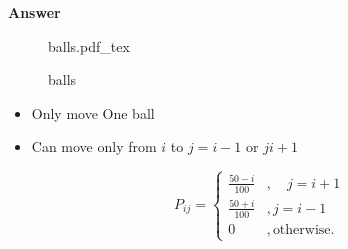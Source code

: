 \documentclass{article}
\newcommand{\incfig}[2][1]{%
\def\svgwidth{#1\columnwidth}
{#2.pdf_tex} } \pdfsuppresswarningpagegroup=1
\theoremstyle{remark}
\begin{document}
   \textbf{Answer}

\begin{figure}[ht]
    \centering
    \incfig{balls}
    \caption{balls}
    \label{fig:balls}
\end{figure}

\begin{itemize}
  \item Only move One ball
  \item Can move only from $i$ to $ j = i-1$ or  $j i +1$
\end{itemize}
\[
P_{ij} = \begin{cases}
  \frac{50 -i}{ 100 }   & , \quad  j = i+1 \\
   \frac{50+i}{100}   & , j = i-1 \\
   0  & , \text{otherwise}.
\end{cases}
\]

\end{document}

